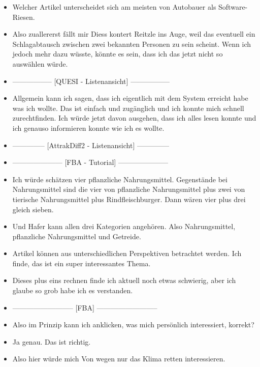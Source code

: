 {\begin{itemize}[]
            \item {} Welcher Artikel unterscheidet sich am meisten von \flqq Autobauer als Software-Riesen\frqq{}.
            \item {} Also zuallererst fällt mir Diess kontert Reitzle ins Auge, weil das eventuell ein Schlagabtausch zwischen zwei bekannten Personen zu sein scheint.
                  Wenn ich jedoch mehr dazu wüsste, könnte es sein, dass ich das jetzt nicht so auswählen würde.
            \item {-----------------} [QUESI - Listenansicht] {-----------------}
            \item {} Allgemein kann ich sagen, dass ich eigentlich mit dem System erreicht habe was ich wollte.
                  Das ist einfach und zugänglich und ich konnte mich schnell zurechtfinden.
                  Ich würde jetzt davon ausgehen, dass ich alles lesen konnte und ich genauso informieren konnte wie ich es wollte.
            \item {--------------} [AttrakDiff2 - Listenansicht] {--------------}
            \item {---------------------} [FBA - Tutorial] {---------------------}
            \item {} Ich würde schätzen vier pflanzliche Nahrungsmittel.
                  Gegenstände bei Nahrungsmittel sind die vier von pflanzliche Nahrungsmittel plus zwei von tierische Nahrungsmittel plus Rindfleischburger.
                  Dann wären vier plus drei gleich sieben.
            \item {} Und Hafer kann allen drei Kategorien angehören. Also Nahrungsmittel, pflanzliche Nahrungsmittel und Getreide.
            \item {} Artikel können aus unterschiedlichen Perspektiven betrachtet werden. Ich finde, das ist ein super interessantes Thema.
            \item {} Dieses plus eins rechnen finde ich aktuell noch etwas schwierig, aber ich glaube so grob habe ich es verstanden.
            \item {--------------------------} [FBA] {--------------------------}
            \item {} Also im Prinzip kann ich anklicken, was mich persönlich interessiert, korrekt?
            \item {} Ja genau. Das ist richtig.
            \item {} Also hier würde mich \flqq Von wegen nur das Klima retten\frqq{} interessieren.

\end{itemize}}
